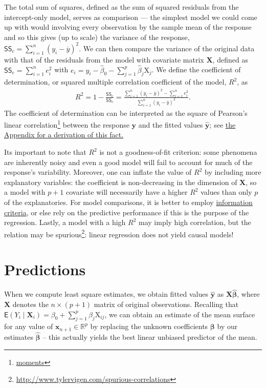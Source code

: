 \documentclass[
  11pt,
  letterpaper,
]{book}
\renewcommand{\href}[2]{#2\footnote{\url{#1}}}
\theoremstyle{definition}
\theoremstyle{definition}
\theoremstyle{definition}
\theoremstyle{definition}
\theoremstyle{remark}
\begin{document}
The total sum of squares, defined as the sum of squared residuals from the intercept-only model, serves as comparison --- the simplest model we could come up with would involving every observation by the sample mean of the response and so this gives (up to scale) the variance of the response, \(\mathsf{SS}_c = \sum_{i=1}^n (y_i - \overline{y})^2\). We can then compare the variance of the original data with that of the residuals from the model with covariate matrix \(\mathbf{X}\), defined as \(\mathsf{SS}_e =\sum_{i=1}^n e_i^2\) with \(e_i = y_i - \widehat{\beta}_0 - \sum_{j=1}^p \widehat{\beta}_j\mathrm{X}_j\).
We define the coefficient of determination, or squared multiple correlation coefficient of the model, \(R^2\), as
\begin{align*}
R^2 = 1- \frac{\mathsf{SS}_e}{\mathsf{SS}_c} = \frac{\sum_{i=1}^n (y_i - \overline{y})^2- \sum_{i=1}^n e_i^2}{\sum_{i=1}^n (y_i - \overline{y})^2}.
\end{align*}
The coefficient of determination can be interpreted as the square of \href{moments}{Pearson's linear correlation} between the response \(\boldsymbol{y}\) and the fitted values \(\widehat{\boldsymbol{y}}\); see \protect\hyperlink{derivationR2}{the Appendix for a derivation of this fact.}

Its important to note that \(R^2\) is not a goodness-of-fit criterion: some phenomena are inherently noisy and even a good model will fail to account for much of the response's variability. Moreover, one can inflate the value of \(R^2\) by including more explanatory variables: the coefficient is non-decreasing in the dimension of \(\mathbf{X}\), so a model with \(p+1\) covariate will necessarily have a higher \(R^2\) values than only \(p\) of the explanatories. For model comparisons, it is better to employ \protect\hyperlink{information-criteria}{information criteria}, or else rely on the predictive performance if this is the purpose of the regression. Lastly, a model with a high \(R^2\) may imply high correlation, but \href{http://www.tylervigen.com/spurious-correlations}{the relation may be spurious}: linear regression does not yield causal models!

\hypertarget{predictions-lm}{%
\section{Predictions}\label{predictions-lm}}

When we compute least square estimates, we obtain fitted values \(\widehat{\boldsymbol{y}}\) as \(\mathbf{X}\widehat{\boldsymbol{\beta}}\), where \(\mathbf{X}\) denotes the \(n \times (p+1)\) matrix of original observations. Recalling that \(\mathsf{E}(Y_i \mid \mathbf{X}_i) = \beta_0 + \sum_{j=1}^p \beta_j \mathrm{X}_{ij}\), we can obtain an estimate of the mean surface for any value of \(\mathbf{x}_{n+1} \in \mathbb{R}^p\) by replacing the unknown coefficients \(\boldsymbol{\beta}\) by our estimates \(\widehat{\boldsymbol{\beta}}\) -- this actually yields the best linear unbiased predictor of the mean.
\end{document}
